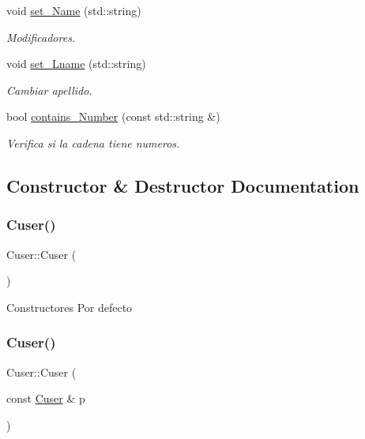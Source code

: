 \begin{DoxyCompactItemize}
void \hyperlink{class_cuser_a08dc9670cd906182f42aea200e89dcbc}{set\+\_\+\+Name} (std\+::string)
\begin{DoxyCompactList}\small\item\em Modificadores. \end{DoxyCompactList}\item 
\mbox{\label{class_cuser_a0835a78ce50fb0b78e1262655d3010e5}} 
void \hyperlink{class_cuser_a0835a78ce50fb0b78e1262655d3010e5}{set\+\_\+\+Lname} (std\+::string)
\begin{DoxyCompactList}\small\item\em Cambiar apellido. \end{DoxyCompactList}\item 
\mbox{\label{class_cuser_aab262c915794aa370145bbe2a7f1494f}} 
bool \hyperlink{class_cuser_aab262c915794aa370145bbe2a7f1494f}{contains\+\_\+\+Number} (const std\+::string \&)
\begin{DoxyCompactList}\small\item\em Verifica si la cadena tiene numeros. \end{DoxyCompactList}\end{DoxyCompactItemize}


\subsection{Constructor \& Destructor Documentation}
\mbox{\label{class_cuser_a28d26161b1076a72f30e41d52132e636}} 
\subsubsection{\texorpdfstring{Cuser()}{Cuser()}\hspace{0.1cm}{\footnotesize\ttfamily [1/3]}}
{\footnotesize\ttfamily Cuser\+::\+Cuser (\begin{DoxyParamCaption}{ }\end{DoxyParamCaption})}

Constructores Por defecto \mbox{\label{class_cuser_a6c2305c658e82cd50ec20778069b1539}} 
\subsubsection{\texorpdfstring{Cuser()}{Cuser()}\hspace{0.1cm}{\footnotesize\ttfamily [2/3]}}
{\footnotesize\ttfamily Cuser\+::\+Cuser (\begin{DoxyParamCaption}\item[{const \hyperlink{class_cuser}{Cuser} \&}]{p }\end{DoxyParamCaption})}




